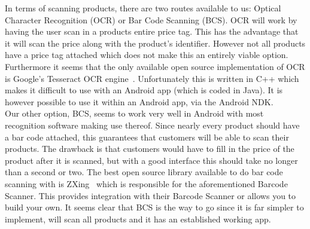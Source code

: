In terms of scanning products, there are two routes available to us: Optical Character Recognition (OCR) or Bar Code Scanning (BCS). OCR will work by having the user scan in a products entire price tag. This has the advantage that it will scan the price along with the product's identifier. However not all products have a price tag attached which does not make this an entirely viable option. Furthermore it seems that the only available open source implementation of OCR is Google's Tesseract OCR engine~\cite{tesseract}. Unfortunately this is written in C++ which makes it difficult to use with an Android app (which is coded in Java). It is however possible to use it within an Android app, via the Android NDK. \\
Our other option, BCS, seems to work very well in Android with most recognition software making use thereof. Since nearly every product should have a bar code attached, this guarantees that customers will be able to scan their products. The drawback is that customers would have to fill in the price of the product after it is scanned, but with a good interface this should take no longer than a second or two. The best open source library available to do bar code scanning with is ZXing~\cite{zxing} which is responsible for the aforementioned Barcode Scanner. This provides integration with their Barcode Scanner or allows you to build your own. It seems clear that BCS is the way to go since it is far simpler to implement, will scan all products and it has an established working app.
